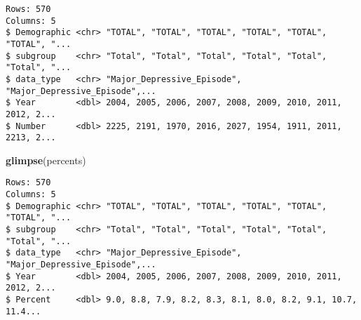\documentclass[
]{article}
\newenvironment{Shaded}{\begin{snugshade}}{\end{snugshade}}
\newcommand{\DataTypeTok}[1]{\textcolor[rgb]{0.13,0.29,0.53}{#1}}
\newcommand{\KeywordTok}[1]{\textcolor[rgb]{0.13,0.29,0.53}{\textbf{#1}}}
\newcommand{\NormalTok}[1]{#1}
\newcommand{\OperatorTok}[1]{\textcolor[rgb]{0.81,0.36,0.00}{\textbf{#1}}}
\newcommand{\StringTok}[1]{\textcolor[rgb]{0.31,0.60,0.02}{#1}}
\begin{document}
\begin{Shaded}
\end{Shaded}

\begin{verbatim}
Rows: 570
Columns: 5
$ Demographic <chr> "TOTAL", "TOTAL", "TOTAL", "TOTAL", "TOTAL", "TOTAL", "...
$ subgroup    <chr> "Total", "Total", "Total", "Total", "Total", "Total", "...
$ data_type   <chr> "Major_Depressive_Episode", "Major_Depressive_Episode",...
$ Year        <dbl> 2004, 2005, 2006, 2007, 2008, 2009, 2010, 2011, 2012, 2...
$ Number      <dbl> 2225, 2191, 1970, 2016, 2027, 1954, 1911, 2011, 2213, 2...
\end{verbatim}

\begin{Shaded}
\begin{Highlighting}[]
\KeywordTok{glimpse}\NormalTok{(percents)}
\end{Highlighting}
\end{Shaded}

\begin{verbatim}
Rows: 570
Columns: 5
$ Demographic <chr> "TOTAL", "TOTAL", "TOTAL", "TOTAL", "TOTAL", "TOTAL", "...
$ subgroup    <chr> "Total", "Total", "Total", "Total", "Total", "Total", "...
$ data_type   <chr> "Major_Depressive_Episode", "Major_Depressive_Episode",...
$ Year        <dbl> 2004, 2005, 2006, 2007, 2008, 2009, 2010, 2011, 2012, 2...
$ Percent     <dbl> 9.0, 8.8, 7.9, 8.2, 8.3, 8.1, 8.0, 8.2, 9.1, 10.7, 11.4...
\end{verbatim}
\end{document}
